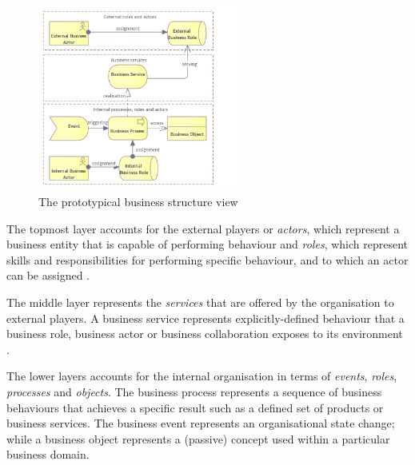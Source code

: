	
	\begin{figure}[h]
		\centering
		\includegraphics[width=0.6\textwidth]{images/views/Business view.png}
		\caption{The prototypical business structure view}
		\label{fig:business-structure-protopypical}
	\end{figure} 
	
	The topmost layer accounts for the external players or \textit{actors}, which represent a business entity that is capable of performing behaviour and \textit{roles}, which represent skills and responsibilities for performing specific behaviour, and to which an actor can be assigned \citep{archimate3.1}. 
	
	The middle layer represents the \textit{services} that are offered by the organisation to external players. A business service represents explicitly-defined behaviour that a business role, business actor or business collaboration exposes to its environment \citep{archimate3.1}.
	

	
	The lower layers accounts for the internal organisation in terms of \textit{events}, \textit{roles}, \textit{processes} and \textit{objects}. The business process represents a sequence of business behaviours that achieves a specific result such as a defined set of products or business services. The business event represents an organisational state change; while a business object represents a (passive) concept used within a particular business domain.
	

